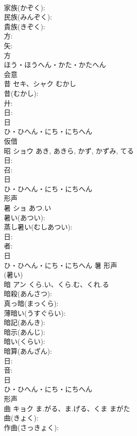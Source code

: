 \documentclass[8pt]{extreport}
\begin{document}
\begin{CJK}{UTF8}{min}
\\	家族(かぞく): 
\\	民族(みんぞく): 
\\	貴族(きぞく): 
\\	方: 
\\	矢: 
\\	方	
\\	ほう・ほうへん・かた・かたへん	
\\	会意 
\\	昔	セキ、シャク	むかし		
\\	昔(むかし): 
\\	廾: 
\\	日: 
\\	日	
\\	ひ・ひへん・にち・にちへん	
\\	仮借 
\\	昭	ショウ		あき, あきら, かず, かずみ, てる	
\\	日: 
\\	召: 
\\	日	
\\	ひ・ひへん・にち・にちへん	
\\	形声 
\\	暑	ショ	あつ.い		
\\	暑い(あつい): 
\\	蒸し暑い(むしあつい): 
\\	日: 
\\	者: 
\\	日	
\\	ひ・ひへん・にち・にちへん	暑	形声 
\\	(暑い) 
\\	暗	アン	くら.い、くら.む、くれ.る		
\\	暗殺(あんさつ): 
\\	真っ暗(まっくら): 
\\	薄暗い(うすぐらい): 
\\	暗記(あんき): 
\\	暗示(あんじ): 
\\	暗い(くらい): 
\\	暗算(あんざん): 
\\	日: 
\\	音: 
\\	日	
\\	ひ・ひへん・にち・にちへん	
\\	形声 
\\	曲	キョク	ま.がる、ま.げる、くま	まがた	
\\	曲(きょく): 
\\	作曲(さっきょく): 

\end{CJK}
\end{document}
